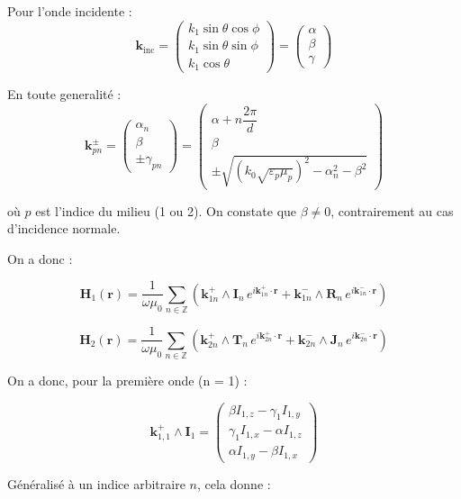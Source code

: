 \documentclass{article}
\begin{document}
\medskip

Pour l’onde incidente :
\[
\mathbf{k}_{\text{inc}} = 
\begin{pmatrix}
k_1 \sin\theta \cos\phi \\
k_1 \sin\theta \sin\phi \\
k_1 \cos\theta
\end{pmatrix}
=
\begin{pmatrix}
\alpha \\
\beta \\
\gamma
\end{pmatrix}
\]

En toute generalité : 
\medskip
\[
\mathbf{k}_{pn}^{\pm} =
\begin{pmatrix}
\alpha_n \\
\beta \\
\pm \gamma_{pn}
\end{pmatrix}
=
\begin{pmatrix}
\alpha + n \dfrac{2\pi}{d} \\
\beta \\
\pm \sqrt{\left(k_0 \sqrt{\varepsilon_p \mu_p}\right)^2 - \alpha_n^2 - \beta^2}
\end{pmatrix}
\]

où $p$ est l'indice du milieu (1 ou 2). On constate que $\beta \neq 0$, contrairement au cas d'incidence normale.


On a donc : 

\[
\mathbf{H}_1(\mathbf{r}) = \frac{1}{\omega \mu_0} \sum_{n \in \mathbb{Z}} 
\left( \mathbf{k}_{1n}^{+} \wedge \mathbf{I}_n \, e^{i \mathbf{k}_{1n}^{+} \cdot \mathbf{r}} + 
       \mathbf{k}_{1n}^{-} \wedge \mathbf{R}_n \, e^{i \mathbf{k}_{1n}^{-} \cdot \mathbf{r}} \right)
\]

\[
\mathbf{H}_2(\mathbf{r}) = \frac{1}{\omega \mu_0} \sum_{n \in \mathbb{Z}} 
\left( \mathbf{k}_{2n}^{+} \wedge \mathbf{T}_n \, e^{i \mathbf{k}_{2n}^{+} \cdot \mathbf{r}} + 
       \mathbf{k}_{2n}^{-} \wedge \mathbf{J}_n \, e^{i \mathbf{k}_{2n}^{-} \cdot \mathbf{r}} \right)
\]

On a donc, pour la première onde (n = 1) :

\[
\mathbf{k}_{1,1}^{+} \wedge \mathbf{I}_1 =
\begin{pmatrix}
\beta I_{1,z} - \gamma_1 I_{1,y} \\
\gamma_1 I_{1,x} - \alpha I_{1,z} \\
\alpha I_{1,y} - \beta I_{1,x}
\end{pmatrix}
\]

Généralisé à un indice arbitraire \( n \), cela donne :
\end{document}
